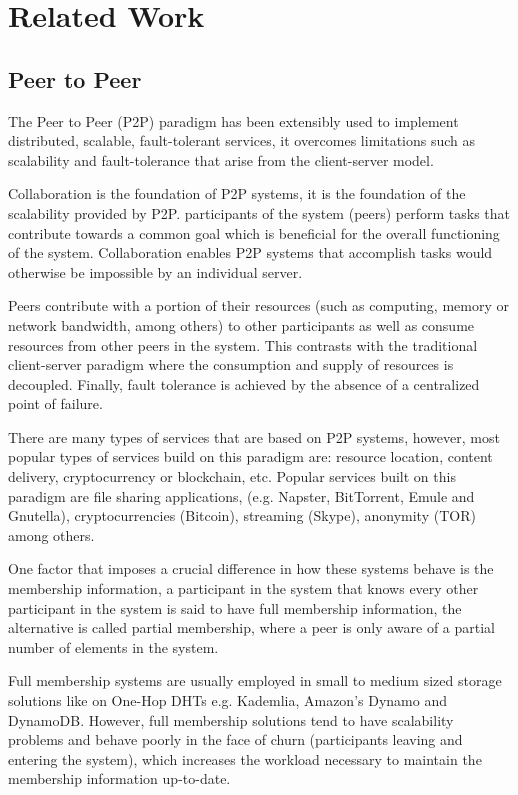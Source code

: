 \chapter{Related Work}
\label{cha:related_work}


\section{Peer to Peer} %
\label{sec:p2p}

The Peer to Peer (P2P) paradigm has been extensibly used to implement distributed, scalable, fault-tolerant services, it overcomes limitations such as scalability and fault-tolerance that arise from the client-server model. 

Collaboration is the foundation of P2P systems, it is the foundation of the scalability provided by P2P. participants of the system (peers) perform tasks that contribute towards a common goal which is beneficial for the overall functioning of the system. Collaboration enables P2P systems that accomplish tasks would otherwise be impossible by an individual server.  %

Peers contribute with a portion of their resources (such as computing, memory or network bandwidth, among others) to other participants as well as consume resources from other peers in the system. This contrasts with the traditional client-server paradigm where the consumption and supply of resources is decoupled. Finally, fault tolerance is achieved by the absence of a centralized point of failure.

There are many types of services that are based on P2P systems, however, most popular types of services build on this paradigm are: resource location, content delivery, cryptocurrency or blockchain, etc. Popular services built on this paradigm are file sharing applications, (e.g. Napster, BitTorrent, Emule and Gnutella), cryptocurrencies (Bitcoin), streaming (Skype), anonymity (TOR) among others. 

One factor that imposes a crucial difference in how these systems behave is the membership information, a participant in the system that knows every other participant in the system is said to have full membership information, the alternative is called partial membership, where a peer is only aware of a partial number of elements in the system.

Full membership systems are usually employed in small to medium sized storage solutions like on One-Hop DHTs e.g. Kademlia, Amazon's Dynamo and DynamoDB. However, full membership solutions tend to have scalability problems and behave poorly in the face of churn (participants leaving and entering the system), which increases the workload necessary to maintain the membership information up-to-date. 

